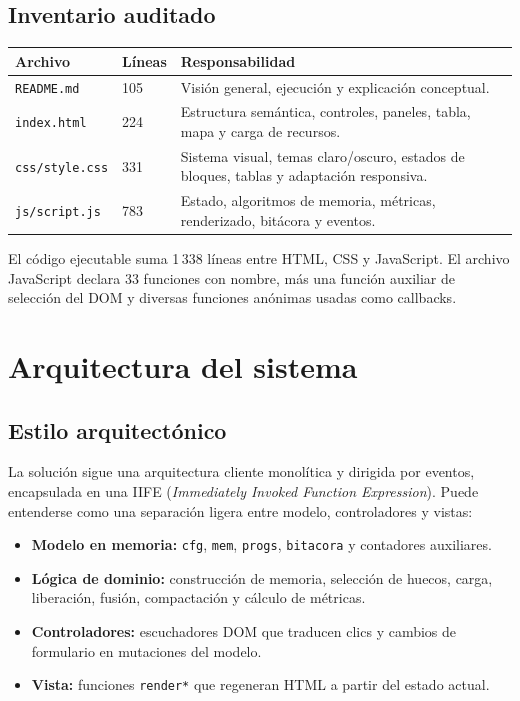\documentclass[11pt,a4paper]{article}
\newcommand{\archivo}[1]{\texttt{#1}}
\begin{document}
\subsection{Inventario auditado}

\begin{longtable}{p{}p{}p{}}
\toprule
\textbf{Archivo} & \textbf{Líneas} & \textbf{Responsabilidad}\\
\midrule
\endhead
\archivo{README.md} & 105 & Visión general, ejecución y explicación conceptual.\\
\archivo{index.html} & 224 & Estructura semántica, controles, paneles, tabla, mapa y carga de recursos.\\
\archivo{css/style.css} & 331 & Sistema visual, temas claro/oscuro, estados de bloques, tablas y adaptación responsiva.\\
\archivo{js/script.js} & 783 & Estado, algoritmos de memoria, métricas, renderizado, bitácora y eventos.\\
\bottomrule
\end{longtable}

El código ejecutable suma 1\,338 líneas entre HTML, CSS y JavaScript. El archivo
JavaScript declara 33 funciones con nombre, más una función auxiliar de selección
del DOM y diversas funciones anónimas usadas como callbacks.

\section{Arquitectura del sistema}

\subsection{Estilo arquitectónico}

La solución sigue una arquitectura cliente monolítica y dirigida por eventos,
encapsulada en una IIFE (\emph{Immediately Invoked Function Expression}). Puede
entenderse como una separación ligera entre modelo, controladores y vistas:

\begin{itemize}
  \item \textbf{Modelo en memoria:} \texttt{cfg}, \texttt{mem}, \texttt{progs},
  \texttt{bitacora} y contadores auxiliares.
  \item \textbf{Lógica de dominio:} construcción de memoria, selección de huecos,
  carga, liberación, fusión, compactación y cálculo de métricas.
  \item \textbf{Controladores:} escuchadores DOM que traducen clics y cambios de
  formulario en mutaciones del modelo.
  \item \textbf{Vista:} funciones \texttt{render*} que regeneran HTML a partir del
  estado actual.
\end{itemize}
\end{document}
